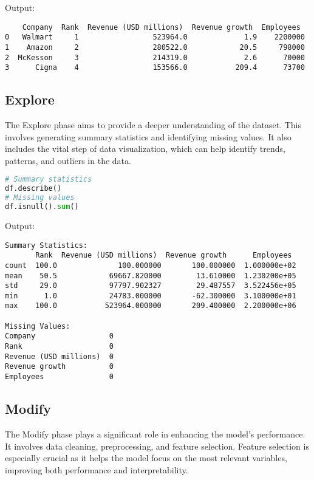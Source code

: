 \documentclass[12pt]{article}
\begin{document}
Output:

\begin{verbatim}
    Company  Rank  Revenue (USD millions)  Revenue growth  Employees
0   Walmart     1                 523964.0             1.9    2200000
1    Amazon     2                 280522.0            20.5     798000
2  McKesson     3                 214319.0             2.6      70000
3      Cigna    4                 153566.0           209.4      73700

\end{verbatim}

\subsection{Explore}

The Explore phase aims to provide a deeper understanding of the dataset. This involves generating summary statistics and identifying missing values. It also includes the vital step of data visualization, which can help identify trends, patterns, and outliers in the data.

\begin{lstlisting}[language=Python]
# Summary statistics
df.describe()
# Missing values
df.isnull().sum()
\end{lstlisting}

Output:

\begin{verbatim}
Summary Statistics:
       Rank  Revenue (USD millions)  Revenue growth      Employees
count  100.0              100.000000       100.000000  1.000000e+02
mean    50.5            69667.820000        13.610000  1.230200e+05
std     29.0            97797.902327        29.487557  3.522456e+05
min      1.0            24783.000000       -62.300000  3.100000e+01
max    100.0           523964.000000       209.400000  2.200000e+06

Missing Values:
Company                 0
Rank                    0
Revenue (USD millions)  0
Revenue growth          0
Employees               0
\end{verbatim}

\subsection{Modify}

The Modify phase plays a significant role in enhancing the model's performance. It involves data cleaning, preprocessing, and feature selection. Feature selection is especially crucial as it helps the model focus on the most relevant variables, improving both performance and interpretability.
\end{document}
